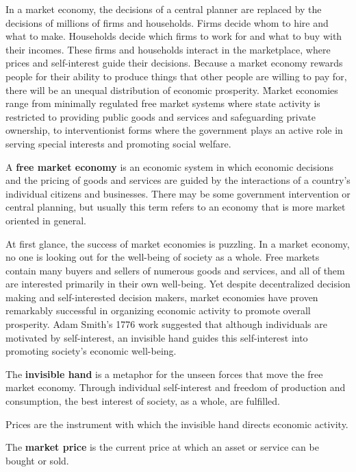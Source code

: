 In a market economy, the decisions of a central planner are replaced by the decisions of millions of firms and
households. Firms decide whom to hire and what to make. Households decide which firms to work for and what to buy
with their incomes. These firms and households interact in the marketplace, where prices and self-interest guide
their decisions. Because a market economy rewards people for their ability to produce things that other people are
willing to pay for, there will be an unequal distribution of economic prosperity. \v

Market economies range from minimally regulated free market systems where state activity is restricted to providing
public goods and services and safeguarding private ownership, to interventionist forms where the government plays an
active role in serving special interests and promoting social welfare.

A \textbf{free market economy} is an economic system in which economic decisions and the pricing of goods and
services are guided by the interactions of a country's individual citizens and businesses. There may be some
government intervention or central planning, but usually this term refers to an economy that is more market oriented
in general.
\ed

At first glance, the success of market economies is puzzling. In a market economy, no one is looking out for the
well-being of society as a whole. Free markets contain many buyers and sellers of numerous goods and services, and
all of them are interested primarily in their own well-being. Yet despite decentralized decision making and
self-interested decision makers, market economies have proven remarkably successful in organizing economic activity
to promote overall prosperity. Adam Smith's 1776 work suggested that although individuals are motivated by
self-interest, an invisible hand guides this self-interest into promoting society's economic well-being.

The \textbf{invisible hand} is a metaphor for the unseen forces that move the free market economy. Through individual
self-interest and freedom of production and consumption, the best interest of society, as a whole, are fulfilled.
\ed

Prices are the instrument with which the invisible hand directs economic activity.

The \textbf{market price} is the current price at which an asset or service can be bought or sold.
\ed

